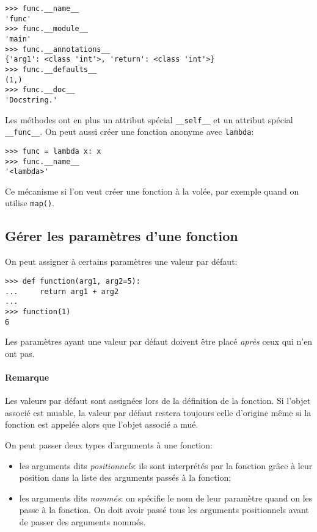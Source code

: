 \begin{verbatim}
>>> func.__name__
'func'
>>> func.__module__
'main'
>>> func.__annotations__
{'arg1': <class 'int'>, 'return': <class 'int'>}
>>> func.__defaults__
(1,)
>>> func.__doc__
'Docstring.'
\end{verbatim}

Les méthodes ont en plus un attribut spécial \texttt{__self__} et un attribut spécial \texttt{__func__}. On peut aussi créer une fonction anonyme avec \texttt{lambda}:

\begin{verbatim}
>>> func = lambda x: x
>>> func.__name__
'<lambda>'
\end{verbatim}

Ce mécanisme si l'on veut créer une fonction à la volée, par exemple quand on utilise \texttt{map()}.

\subsection{Gérer les paramètres d'une fonction}

On peut assigner à certains paramètres une valeur par défaut:

\begin{verbatim}
>>> def function(arg1, arg2=5):
...     return arg1 + arg2
... 
>>> function(1)
6
\end{verbatim}

Les paramètres ayant une valeur par défaut doivent être placé \emph{après} ceux qui n'en ont pas.

\paragraph*{Remarque} Les valeurs par défaut sont assignées lors de la définition de la fonction. Si l'objet associé est
muable, la valeur par défaut restera toujours celle d'origine même si la fonction est appelée alors que l'objet associé
a mué.\bigskip

On peut passer deux types d'arguments à une fonction:
\begin{itemize}
    \item les arguments dits \emph{positionnels}: ils sont interprétés par la fonction grâce à leur position dans
          la liste des arguments passés à la fonction;
    \item les arguments dits \emph{nommés}: on spécifie le nom de leur paramètre quand on les passe à la fonction.
          On doit avoir passé tous les arguments positionnels avant de passer des arguments nommés.
\end{itemize}

